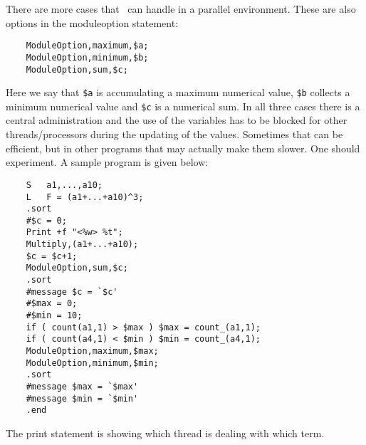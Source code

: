 There are more cases that \FORM\ can handle in a parallel environment. 
These are also options in the moduleoption statement:
\begin{verbatim}
    ModuleOption,maximum,$a;
    ModuleOption,minimum,$b;
    ModuleOption,sum,$c;
\end{verbatim}
Here we say that \verb:$a: is accumulating a maximum numerical value, 
\verb:$b: collects a minimum numerical value and \verb:$c: is a numerical 
sum. In all three cases there is a central administration and the use of 
the variables has to be blocked for other threads/processors during the 
updating of the values. Sometimes that can be efficient, but in other 
programs that may actually make them slower. One should experiment. A 
sample program is given below:
\begin{verbatim}
    S   a1,...,a10;
    L   F = (a1+...+a10)^3;
    .sort
    #$c = 0;
    Print +f "<%w> %t";
    Multiply,(a1+...+a10);
    $c = $c+1;
    ModuleOption,sum,$c;
    .sort
    #message $c = `$c'
    #$max = 0;
    #$min = 10;
    if ( count(a1,1) > $max ) $max = count_(a1,1);
    if ( count(a4,1) < $min ) $min = count_(a4,1);
    ModuleOption,maximum,$max;
    ModuleOption,minimum,$min;
    .sort
    #message $max = `$max'
    #message $min = `$min'
    .end
\end{verbatim}
The print statement is showing which thread is dealing with which term.
